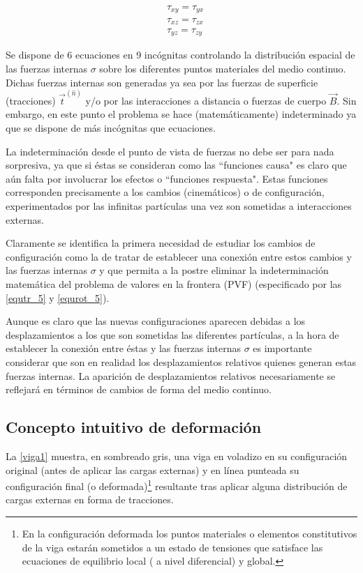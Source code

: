 \documentclass[../notas medios.tex]{subfiles}
\begin{document}
\begin{equation} \label{equrot_5}
\begin{split}
& \tau _{xy} = {\tau _{yx}} \\
& \tau _{xz} = {\tau _{zx}} \\
& \tau _{yz} = {\tau _{zy}}
\end{split}
\end{equation}

Se dispone de 6 ecuaciones en 9 incógnitas controlando la distribución espacial de las fuerzas internas $\sigma$ sobre los diferentes puntos materiales del medio continuo.  Dichas fuerzas internas son generadas ya sea por las fuerzas de superficie (tracciones) ${{\vec t}^{(\hat n)}}$  y/o por las interacciones a distancia o fuerzas de cuerpo ${\vec B}$.  Sin embargo, en este punto el problema se hace (matemáticamente) indeterminado ya que se dispone de más incógnitas que ecuaciones.

La indeterminación desde el punto de vista de fuerzas no debe ser para nada sorpresiva, ya que si éstas se consideran como las ``funciones causa" es claro que aún falta por involucrar los efectos o ``funciones respuesta". Estas funciones corresponden precisamente a los cambios (cinemáticos) o de configuración, experimentados por las infinitas partículas una vez son sometidas a interacciones externas.

Claramente se identifica la primera necesidad de estudiar los cambios de configuración como la de tratar de establecer una conexión entre estos cambios y las fuerzas internas $\sigma$ y que permita a la postre eliminar la indeterminación matemática del problema de valores en la frontera (PVF) (especificado por las \cref{equtr_5} y \cref{equrot_5}).

Aunque es claro que las nuevas configuraciones aparecen debidas a los desplazamientos a los que son sometidas las diferentes partículas, a la hora de establecer la conexión entre éstas y las fuerzas internas $\sigma$ es importante considerar que son en realidad los desplazamientos relativos  quienes generan estas fuerzas internas.  La aparición de desplazamientos relativos necesariamente se reflejará en términos de cambios de forma  del medio continuo.

\subsection{Concepto intuitivo de deformación}
La \cref{viga1} muestra, en sombreado gris, una viga en voladizo en su configuración original (antes de aplicar las cargas externas) y en línea punteada su configuración final (o deformada)\footnote{En la configuración deformada los puntos materiales o elementos constitutivos de la viga estarán sometidos a un estado de tensiones que satisface las ecuaciones de equilibrio local ( a nivel diferencial) y global.} resultante tras aplicar alguna distribución de cargas externas en forma de tracciones.
\end{document}
